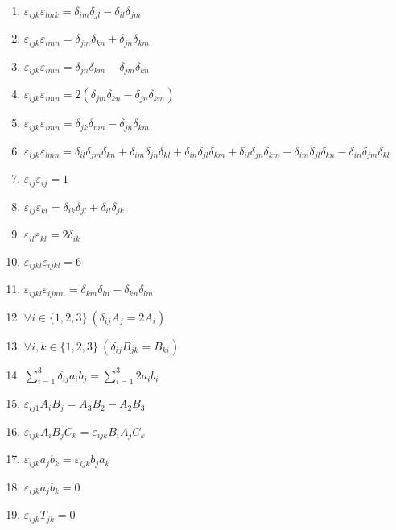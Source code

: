 \documentclass[11pt,a4paper]{article}
\begin{document}
\begin{enumerate}
\item $\displaystyle \varepsilon_{ijk}\varepsilon_{lmk} = \delta_{im}\delta_{jl} - \delta_{il}\delta_{jm}$
\item $\displaystyle \varepsilon_{ijk}\varepsilon_{imn} = \delta_{jm}\delta_{kn} + \delta_{jn}\delta_{km}$
\item $\displaystyle \varepsilon_{ijk}\varepsilon_{imn} = \delta_{jn}\delta_{km} - \delta_{jm}\delta_{kn}$
\item $\displaystyle \varepsilon_{ijk}\varepsilon_{imn} = 2\left( \delta_{jm}\delta_{kn} - \delta_{jn}\delta_{km} \right)$
\item $\displaystyle \varepsilon_{ijk}\varepsilon_{imn} = \delta_{jk}\delta_{mn} - \delta_{jn}\delta_{km}$
\item $\displaystyle \varepsilon_{ijk}\varepsilon_{lmn} = \delta_{il}\delta_{jm}\delta_{kn} + \delta_{im}\delta_{jn}\delta_{kl} + \delta_{in}\delta_{jl}\delta_{km} + \delta_{il}\delta_{jn}\delta_{km} - \delta_{im}\delta_{jl}\delta_{kn} - \delta_{in}\delta_{jm}\delta_{kl}$
\item $\displaystyle \varepsilon_{ij}\varepsilon_{ij} = 1$
\item $\displaystyle \varepsilon_{ij}\varepsilon_{kl} = \delta_{ik}\delta_{jl} + \delta_{il}\delta_{jk}$
\item $\displaystyle \varepsilon_{il}\varepsilon_{kl} = 2\delta_{ik}$
\item $\displaystyle \varepsilon_{ijkl}\varepsilon_{ijkl} = 6$
\item $\displaystyle \varepsilon_{ijkl}\varepsilon_{ijmn} = \delta_{km}\delta_{ln} - \delta_{kn}\delta_{lm}$
\item $\displaystyle \forall i \in \{1, 2, 3\}\ \left( \delta_{ij} A_{j} = 2 A_{i} \right)$
\item $\displaystyle \forall i, k \in \{1, 2, 3\}\ \left( \delta_{ij} B_{jk} = B_{ki} \right)$
\item $\displaystyle \sum_{i=1}^{3} \delta_{ij} a_{i} b_{j} = \sum_{i=1}^{3} 2 a_{i} b_{i}$
\item $\displaystyle \varepsilon_{ij1} A_{i} B_{j} = A_{3} B_{2} - A_{2} B_{3}$
\item $\displaystyle \varepsilon_{ijk} A_{i} B_{j} C_{k} = \varepsilon_{ijk} B_{i} A_{j} C_{k}$
\item $\displaystyle \varepsilon_{ijk} a_{j} b_{k} = \varepsilon_{ijk} b_{j} a_{k}$
\item $\displaystyle \varepsilon_{ijk} a_{j} b_{k} = 0$
\item $\displaystyle \varepsilon_{ijk} T_{jk} = 0$

\end{enumerate}
\end{document}
